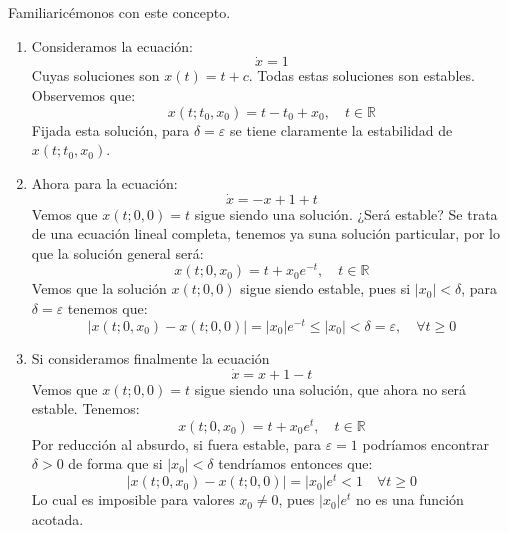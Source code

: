 \begin{ejemplo}
    Familiaricémonos con este concepto.
    \begin{enumerate}
        \item Consideramos la ecuación:
            \begin{equation*}
                \dot{x} = 1
            \end{equation*}
            Cuyas soluciones son $x(t) = t+c$. Todas estas soluciones son estables. Observemos que:
            \begin{equation*}
                x(t;t_0,x_0) = t-t_0+x_0, \quad t\in \mathbb{R}
            \end{equation*}
            Fijada esta solución, para $\delta=\varepsilon$ se tiene claramente la estabilidad de $x(t;t_0,x_0)$.
        \item Ahora para la ecuación:
            \begin{equation*}
                \dot{x} = -x+1+t
            \end{equation*}
            Vemos que $x(t;0,0) = t$ sigue siendo una solución. ¿Será estable? Se trata de una ecuación lineal completa, tenemos ya suna solución particular, por lo que la solución general será:
            \begin{equation*}
                x(t;0,x_0) = t + x_0e^{-t}, \quad t\in \mathbb{R}
            \end{equation*}
            Vemos que la solución $x(t;0,0)$ sigue siendo estable, pues si $|x_0|<\delta$, para $\delta = \varepsilon$ tenemos que:
            \begin{equation*}
                |x(t;0,x_0)-x(t;0,0)| = |x_0|e^{-t} \leq |x_0| < \delta = \varepsilon, \quad \forall t\geq 0
            \end{equation*}
        \item Si consideramos finalmente la ecuación
            \begin{equation*}
                \dot{x} = x+1-t
            \end{equation*}
            Vemos que $x(t;0,0)=t$ sigue siendo una solución, que ahora no será estable. Tenemos:
            \begin{equation*}
                x(t;0,x_0) = t + x_0e^{t}, \quad t\in \mathbb{R}
            \end{equation*}
            Por reducción al absurdo, si fuera estable, para $\varepsilon=1$ podríamos encontrar $\delta>0$ de forma que si $|x_0|<\delta$ tendríamos entonces que:
            \begin{equation*}
                |x(t;0,x_0)-x(t;0,0)| = |x_0| e^t < 1 \quad \forall t\geq 0
            \end{equation*}
            Lo cual es imposible para valores $x_0 \neq 0$, pues $|x_0|e^t$ no es una función acotada.
    \end{enumerate}
\end{ejemplo}

